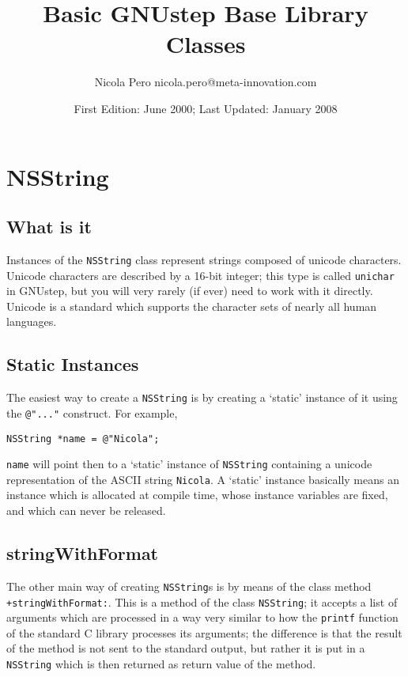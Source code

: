 \documentclass[a4paper]{article}
\begin{document}
\author{Nicola Pero nicola.pero@meta-innovation.com}
\title{Basic GNUstep Base Library Classes}
\date{First Edition: June 2000; Last Updated: January 2008}
\maketitle

\section{NSString}
\subsection{What is it}
Instances of the \texttt{NSString} class represent strings composed of
unicode characters.  Unicode characters are described by a 16-bit
integer; this type is called \texttt{unichar} in GNUstep, but you will
very rarely (if ever) need to work with it directly.  Unicode is a
standard which supports the character sets of nearly all human
languages.

\subsection{Static Instances}
The easiest way to create a \texttt{NSString} is by creating a `static' 
instance of it using the \texttt{@"..."} construct.  For example, 
\begin{verbatim}
NSString *name = @"Nicola";
\end{verbatim}
\texttt{name} will point then to a `static' instance of
\texttt{NSString} containing a unicode representation of the ASCII
string \texttt{Nicola}.  A `static' instance basically means an
instance which is allocated at compile time, whose instance variables
are fixed, and which can never be released.

\subsection{stringWithFormat}
The other main way of creating \texttt{NSString}s is by means of the
class method \texttt{+stringWithFormat:}.  This is a method of the
class \texttt{NSString}; it accepts a list of arguments which are
processed in a way very similar to how the \texttt{printf} function of
the standard C library processes its arguments; the difference is that
the result of the method is not sent to the standard output, but
rather it is put in a \texttt{NSString} which is then returned as
return value of the method.
\end{document}
